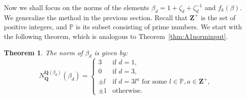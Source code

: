 \documentclass{amsart}
\newcommand{\Q}{\mathbf Q}
\newcommand{\Z}{\mathbf Z}
\numberwithin{equation}{section}
\theoremstyle{plain}
\newtheorem{theorem}{Theorem}
\theoremstyle{definition}
\begin{document}
Now we shall focus on the norms of the elements $\beta_d=1 + \zeta_d + \zeta_d^{-1}$ and $f_k(\beta)$. We generalize the method in the previous section. Recall that $\Z^{+}$ is the set of positive integers, and $\mathbb{P}$ is its subset consisting of prime numbers. We start with the following theorem, which is analogous to Theorem~\ref{thm:A1norminput}. 

\begin{theorem}\label{thm:A2norminput}
The norm of $\beta_d$ is given by:
\[N_{\Q}^{\Q(\beta_d)}(\beta_d) = 
\begin{cases} 
	3 & \text{if } d = 1, \\
	0 & \text{if } d = 3, \\
	\pm l & \text{if } d = 3l^a \text{ for some }l\in\mathbb{P}, a\in\Z^{+},\\
	\pm 1 & \text{otherwise}.
\end{cases}\]
\end{theorem}
\end{document}

